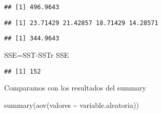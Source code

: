 \documentclass[
]{article}
\newenvironment{Shaded}{\begin{snugshade}}{\end{snugshade}}
\newcommand{\AttributeTok}[1]{\textcolor[rgb]{0.77,0.63,0.00}{#1}}
\newcommand{\DecValTok}[1]{\textcolor[rgb]{0.00,0.00,0.81}{#1}}
\newcommand{\FunctionTok}[1]{\textcolor[rgb]{0.00,0.00,0.00}{#1}}
\newcommand{\NormalTok}[1]{#1}
\newcommand{\OtherTok}[1]{\textcolor[rgb]{0.56,0.35,0.01}{#1}}
\newcommand{\SpecialCharTok}[1]{\textcolor[rgb]{0.00,0.00,0.00}{#1}}
\begin{document}
\begin{verbatim}
## [1] 496.9643
\end{verbatim}

\begin{Shaded}
\end{Shaded}

\begin{verbatim}
## [1] 23.71429 21.42857 18.71429 14.28571
\end{verbatim}

\begin{Shaded}
\end{Shaded}

\begin{verbatim}
## [1] 344.9643
\end{verbatim}

\begin{Shaded}
\begin{Highlighting}[]
\NormalTok{SSE}\OtherTok{=}\NormalTok{SST}\SpecialCharTok{{-}}\NormalTok{SSTr}
\NormalTok{SSE}
\end{Highlighting}
\end{Shaded}

\begin{verbatim}
## [1] 152
\end{verbatim}

Comparamos con los resultados del summary

\begin{Shaded}
\begin{Highlighting}[]
\FunctionTok{summary}\NormalTok{(}\FunctionTok{aov}\NormalTok{(valores }\SpecialCharTok{\textasciitilde{}}\NormalTok{ variable.aleatoria))}
\end{Highlighting}
\end{Shaded}
\end{document}
